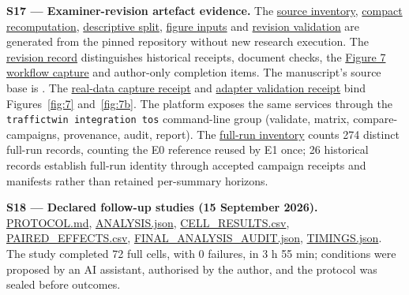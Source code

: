 \documentclass[12pt,a4paper]{article}
\begin{document}
\textbf{S17 --- Examiner-revision artefact evidence.} The \href{\detokenize{evidence/ARTEFACT_INVENTORY.json}}{source inventory}, \href{\detokenize{evidence/COMPACT_CHECKS.json}}{compact recomputation}, \href{\detokenize{evidence/DESCRIPTIVE_SPLIT.json}}{descriptive split}, \href{\detokenize{evidence/RSU_LAYOUT.json}}{figure inputs} and \href{\detokenize{document/REVISION_VALIDATION.json}}{revision validation} are generated from the pinned repository without new research execution. The \href{\detokenize{README.md}}{revision record} distinguishes historical receipts, document checks, the \href{\detokenize{evidence/PLATFORM_RESULTS_CAPTURE.json}}{Figure 7 workflow capture} and author-only completion items. The manuscript's source base is . The \href{\detokenize{evidence/FINAL_PLATFORM_CAPTURE_2026-09-16.json}}{real-data capture receipt} and \href{\detokenize{evidence/TOS_ADAPTER_VALIDATION_2026-09-16.json}}{adapter validation receipt} bind Figures~\ref{fig:7} and~\ref{fig:7b}. The platform exposes the same services through the \texttt{traffictwin integration tos} command-line group (validate, matrix, compare-campaigns, provenance, audit, report). The \href{\detokenize{evidence/FINAL_FULL_RUN_COUNT_2026-09-16.json}}{full-run inventory} counts 274 distinct full-run records, counting the E0 reference reused by E1 once; 26 historical records establish full-run identity through accepted campaign receipts and manifests rather than retained per-summary horizons.

\label{source-s18}

\textbf{S18 --- Declared follow-up studies (15 September 2026).} \href{\detokenize{https://github.com/Abdulla4akash/traffictwin/blob/fe8c8d9e4f725665508e47e61dc6e3286d005450/docs/dissertation/followups_2026-09-15/PROTOCOL.md}}{PROTOCOL.md}, \href{\detokenize{https://github.com/Abdulla4akash/traffictwin/blob/fe8c8d9e4f725665508e47e61dc6e3286d005450/docs/dissertation/followups_2026-09-15/ANALYSIS.json}}{ANALYSIS.json}, \href{\detokenize{https://github.com/Abdulla4akash/traffictwin/blob/fe8c8d9e4f725665508e47e61dc6e3286d005450/docs/dissertation/followups_2026-09-15/CELL_RESULTS.csv}}{CELL\_\allowbreak{}RESULTS.csv}, \href{\detokenize{https://github.com/Abdulla4akash/traffictwin/blob/fe8c8d9e4f725665508e47e61dc6e3286d005450/docs/dissertation/followups_2026-09-15/PAIRED_EFFECTS.csv}}{PAIRED\_\allowbreak{}EFFECTS.csv}, \href{\detokenize{https://github.com/Abdulla4akash/traffictwin/blob/fe8c8d9e4f725665508e47e61dc6e3286d005450/docs/dissertation/followups_2026-09-15/evidence/FINAL_ANALYSIS_AUDIT.json}}{FINAL\_\allowbreak{}ANALYSIS\_\allowbreak{}AUDIT.json}, \href{\detokenize{https://github.com/Abdulla4akash/traffictwin/blob/fe8c8d9e4f725665508e47e61dc6e3286d005450/docs/dissertation/followups_2026-09-15/evidence/TIMINGS.json}}{TIMINGS.json}. The study completed 72 full cells, with 0 failures, in 3 h 55 min; conditions were proposed by an AI assistant, authorised by the author, and the protocol was sealed before outcomes.
\end{document}
